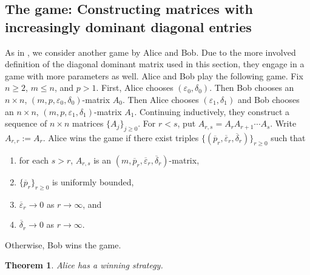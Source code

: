 \documentclass[11pt, letterpaper]{amsart}
\theoremstyle{plain}
\newtheorem{theorem}{Theorem}[section]
\theoremstyle{definition}
\renewcommand{\epsilon}{\varepsilon}
\newcommand{\eps}{\epsilon}
\newcommand{\ov}[1]{\overline{#1}}
\begin{document}
\subsection{The game: Constructing matrices with increasingly dominant
  diagonal entries}\label{ssec:thegame}

As in , we consider another game by Alice and Bob. Due to the more involved definition of the diagonal dominant matrix used in this section, they engage in a game with more parameters as well.
Alice and Bob play the following game. Fix $n\ge 2$, $m\le n$, and $p>1$. 
First, Alice chooses $(\eps_0,\delta_0)$. Then Bob chooses an $n \times n$,
$(m,p,\eps_0,\delta_0)$-matrix $A_0$. Then Alice chooses $(\eps_1,\delta_1)$ and
Bob chooses an $n \times n$, $(m,p,\eps_1,\delta_1)$-matrix $A_1$. Continuing
inductively, they construct a sequence of $n \times n$ matrices
$\{A_j\}_{j \ge 0}$. For $r<s$, put $A_{r,s} = A_rA_{r+1}\cdots A_s$. Write $A_{r,r}:=A_r$.
Alice wins the game if there exist triples $\{(\ov{p}_r,
\ov{\eps}_r,\ov{\delta}_r)\}_{r \ge 0}$ such that
\begin{winninglist}
\begin{enumerate}
\item for each $s>r$, $A_{r,s}$ is an $(m,\ov{p}_r,\ov{\eps}_r,\ov{\delta}_r)$-matrix,
\item $\{\ov{p}_r\}_{r \ge 0}$ is uniformly bounded,
\item $\ov{\eps}_r \to 0$ as $r \to \infty$, and
\item $\ov{\delta}_r \to 0$ as $r \to \infty$.
\end{enumerate}
\caption{Conditions on $\{(\ov{p}_r,
\ov{\eps}_r,\ov{\delta}_r)\}_{r \ge 0}$ for Alice to win in the Alice-Bob game.}
\label{list:Alice_win_unfolding}
\end{winninglist}
Otherwise, Bob wins the game.

\begin{theorem}\label{thm:TheGame}
  Alice has a winning strategy. 
\end{theorem}
\end{document}
